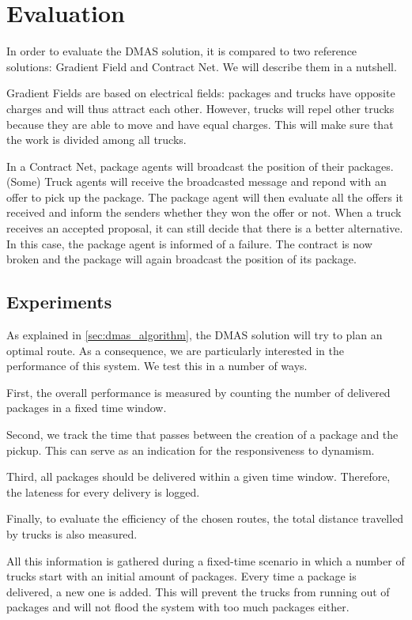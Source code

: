 \section{Evaluation}

\npar In order to evaluate the DMAS solution, it is compared to two reference
solutions: Gradient Field and Contract Net. We will describe them in a nutshell.

\npar Gradient Fields are based on electrical fields: packages and trucks have
opposite charges and will thus attract each other. However, trucks will repel
other trucks because they are able to move and have equal charges.
This will make sure that the work is divided among all trucks.

\npar In a Contract Net, package agents will broadcast the position of their
packages. (Some) Truck agents will receive the broadcasted message and repond
with an offer to pick up the package. The package agent will then evaluate all
the offers it received and inform the senders whether they won the offer or not.
When a truck receives an accepted proposal, it can still decide that there is a
better alternative. In this case, the package agent is informed of a failure.
The contract is now broken and the package will again broadcast the position of
its package.

\subsection{Experiments}

\npar As explained in \ref{sec:dmas_algorithm}, the DMAS solution will try to
plan an optimal route. As a consequence, we are particularly interested in the
performance of this system. We test this in a number of ways.

\npar First, the overall performance is measured by counting the number of
delivered packages in a fixed time window.

\npar Second, we track the time that passes between the creation of a package
and the pickup. This can serve as an indication for the responsiveness to
dynamism.

\npar Third, all packages should be delivered within a given time window.
Therefore, the lateness for every delivery is logged.

\npar Finally, to evaluate the efficiency of the chosen routes, the
total distance travelled by trucks is also measured. 

\npar All this information is gathered during a fixed-time scenario in which
a number of trucks start with an initial amount of packages. Every time a
package is delivered, a new one is added. This will prevent the trucks from
running out of packages and will not flood the system with too much packages
either.

